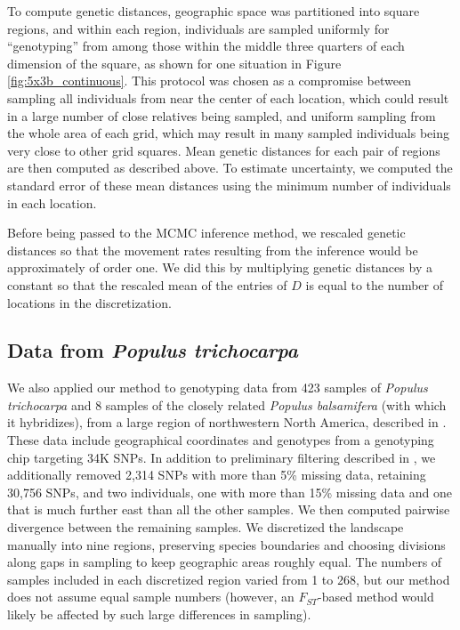 \documentclass{article}
\begin{document}
To compute genetic distances,
geographic space was partitioned into square regions,
and within each region, 
individuals are sampled uniformly for ``genotyping'' 
from among those within the middle three quarters of each dimension of the square,
as shown for one situation in Figure \ref{fig:5x3b_continuous}.
This protocol was chosen as a compromise between sampling all individuals 
from near the center of each location,
which could result in a large number of close relatives being sampled,
and uniform sampling from the whole area of each grid, 
which may result in many sampled individuals being very close to other grid squares.
Mean genetic distances for each pair of regions are then computed as described above.
To estimate uncertainty, we computed the standard error of these mean distances
using the minimum number of individuals in each location.

Before being passed to the MCMC inference method,
we rescaled genetic distances so that the movement rates resulting from the inference
would be approximately of order one.
We did this by multiplying genetic distances by a constant
so that the rescaled mean of the entries of $D$
is equal to the number of locations in the discretization. 

\subsection*{Data from \textit{Populus trichocarpa}}

We also applied our method to genotyping data from 423 samples of \textit{Populus trichocarpa}
and 8 samples of the closely related \textit{Populus balsamifera} (with which it hybridizes),
from a large region of northwestern North America,
described in \citet{geraldes2014landscape}.
These data 
include geographical coordinates and genotypes from a genotyping chip targeting 34K SNPs.
In addition to preliminary filtering described in \citet{geraldes2014landscape},
we additionally removed 2,314 SNPs with more than 5\% missing data, retaining 30,756 SNPs,
and two individuals, one with more than 15\% missing data and one that is much further east
than all the other samples.
We then computed pairwise divergence between the remaining samples.
We discretized the landscape manually into nine regions,
preserving species boundaries and choosing divisions along gaps in sampling
to keep geographic areas roughly equal.
The numbers of samples included in each discretized region varied from 1 to 268,
but our method does not assume equal sample numbers
(however, an $F_{ST}$-based method would likely be affected by such large differences in sampling).
\end{document}
